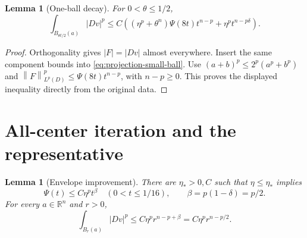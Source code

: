 \documentclass[11pt,a4paper]{article}
\numberwithin{equation}{section}
\newtheorem{lemma}[theorem]{Lemma}
\theoremstyle{definition}
\theoremstyle{remark}
\newcommand{\R}{\mathbb R}
\newcommand{\norm}[1]{\left\lVert#1\right\rVert}
\begin{document}
\begin{lemma}[One-ball decay]\label{lem:one-ball}
For $0<\theta\leq1/2$,
\begin{equation}\label{eq:one-ball}
 \int_{B_{\theta t/2}(a)}|Dv|^p
 \leq C\left((\eta^p+\theta^n)\Psi(8t)t^{n-p}
                    +\eta^pt^{n-p\delta}\right).
\end{equation}
\end{lemma}
\begin{proof}
Orthogonality gives $|F|=|Dv|$ almost everywhere. Insert the same
component bounds into \eqref{eq:projection-small-ball}. Use
$(a+b)^p\leq2^p(a^p+b^p)$ and
$\norm F_{L^p(D)}^p\leq\Psi(8t)t^{n-p}$, with $n-p\geq0$.
This proves the displayed inequality directly from the original data.
\end{proof}

\section{All-center iteration and the representative}\label{sec:iteration}
\begin{lemma}[Envelope improvement]\label{lem:envelope}
There are $\eta_*>0,C$ such that $\eta\leq\eta_*$ implies
\begin{equation}\label{eq:power-growth}
 \Psi(t)\leq C\eta^pt^\beta\quad(0<t\leq1/16),
 \qquad\beta=p(1-\delta)=p/2.
\end{equation}
For every $a\in\R^n$ and $r>0$,
\begin{equation}\label{eq:gradient-growth}
 \int_{B_r(a)}|Dv|^p\leq C\eta^pr^{n-p+\beta}
                         =C\eta^pr^{n-p/2}.
\end{equation}
\end{lemma}
\end{document}
